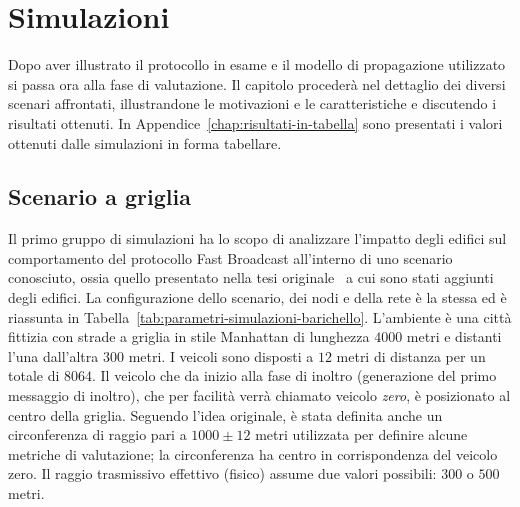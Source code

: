 
\chapter{Simulazioni}\label{chap:simulazioni}
Dopo aver illustrato il protocollo in esame e il modello di propagazione utilizzato si passa ora alla fase di valutazione.
Il capitolo procederà nel dettaglio dei diversi scenari affrontati,
illustrandone le motivazioni e le caratteristiche e discutendo i risultati ottenuti.
In Appendice~\ref{chap:risultati-in-tabella} sono presentati i valori ottenuti dalle simulazioni in forma tabellare.
%
\section{Scenario a griglia}\label{sec:configurazione-griglia}
Il primo gruppo di simulazioni ha lo scopo di analizzare l'impatto degli edifici sul comportamento del protocollo
Fast Broadcast all'interno di uno scenario conosciuto, ossia quello presentato nella tesi originale~\cite{Barichello2017propagazione}
a cui sono stati aggiunti degli edifici.
La configurazione dello scenario, dei nodi e della rete è la stessa ed è riassunta in Tabella~\ref{tab:parametri-simulazioni-barichello}.
L'ambiente è una città fittizia con strade a griglia in stile Manhattan di lunghezza $4000$ metri e distanti l'una dall'altra $300$ metri.
I veicoli sono disposti a $12$ metri di distanza per un totale di $8064$.
Il veicolo che da inizio alla fase di inoltro (generazione del primo messaggio di inoltro),
che per facilità verrà chiamato veicolo \textit{zero}, è posizionato al centro della griglia.
Seguendo l'idea originale, è stata definita anche un circonferenza di raggio pari a $1000\pm12$ metri utilizzata per definire alcune metriche di valutazione;
la circonferenza ha centro in corrispondenza del veicolo zero.
Il raggio trasmissivo effettivo (fisico) assume due valori possibili: $300$ o $500$ metri.
%

